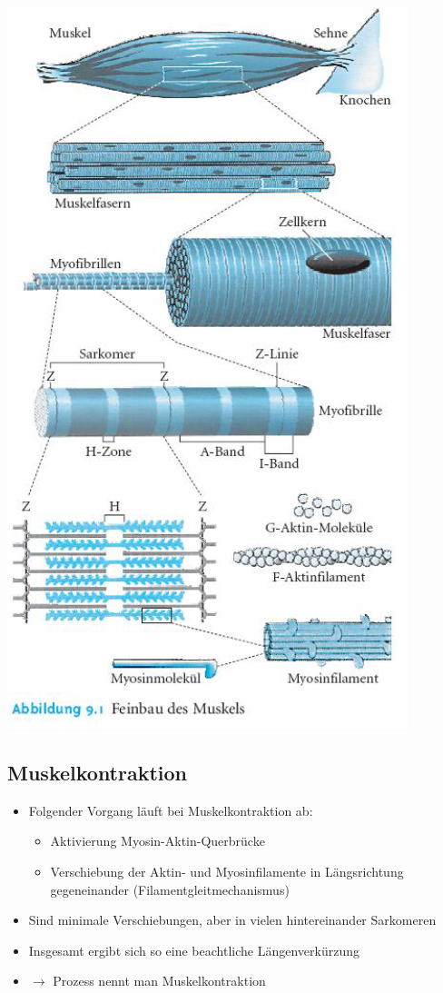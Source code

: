 \documentclass[a4paper,10pt,oneside]{article}
\begin{document}
\includegraphics[scale=0.3]{Grafiken/1409.png}

\subsection{Muskelkontraktion}
\begin{itemize}
	\item Folgender Vorgang läuft bei Muskelkontraktion ab:
		\begin{itemize}
			\item Aktivierung Myosin-Aktin-Querbrücke
			\item Verschiebung der Aktin- und Myosinfilamente in Längsrichtung gegeneinander (Filamentgleitmechanismus)
		\end{itemize}
	\item Sind minimale Verschiebungen, aber in vielen hintereinander Sarkomeren
	\item Insgesamt ergibt sich so eine beachtliche Längenverkürzung
	\item $\rightarrow$ Prozess nennt man Muskelkontraktion
\end{itemize}
\end{document}
